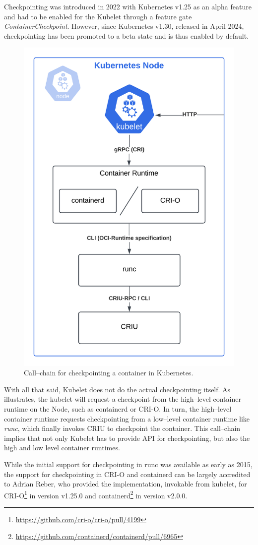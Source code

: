 \documentclass[
  digital,     %
  oneside,     %
  nosansbold,  %
  nocolorbold, %
  lof,         %
  lot,         %
]{fithesis4}
\begin{document}
Checkpointing was introduced in 2022 with Kubernetes v1.25 as an alpha feature and had to be enabled for the Kubelet through a feature gate \emph{ContainerCheckpoint}. However, since Kubernetes v1.30, released in April 2024, checkpointing has been promoted to a beta state and is thus enabled by default.

\begin{figure}[H]
  \begin{center}
  \includegraphics[width=.6\textwidth]{figures/checkpoint-callchain.png}
  \end{center}
  \caption{Call--chain for checkpointing a container in Kubernetes.}
  \label{fig:criu-calltrace}
\end{figure}

With all that said, Kubelet does not do the actual checkpointing itself. As  illustrates, the kubelet will request a checkpoint from the high--level container runtime on the Node, such as containerd or CRI-O. In turn, the high--level container runtime requests checkpointing from a low--level container runtime like \emph{runc}, which finally invokes CRIU to checkpoint the container. This call--chain implies that not only Kubelet has to provide API for checkpointing, but also the high and low level container runtimes.

While the initial support for checkpointing in runc was available as early as 2015, the support for checkpointing in CRI-O and containerd can be largely accredited to Adrian Reber, who provided the implementation, invokable from kubelet, for CRI-O\footnote{\url{https://github.com/cri-o/cri-o/pull/4199}} in version v1.25.0 and containerd\footnote{\url{https://github.com/containerd/containerd/pull/6965}} in version v2.0.0.
\end{document}
